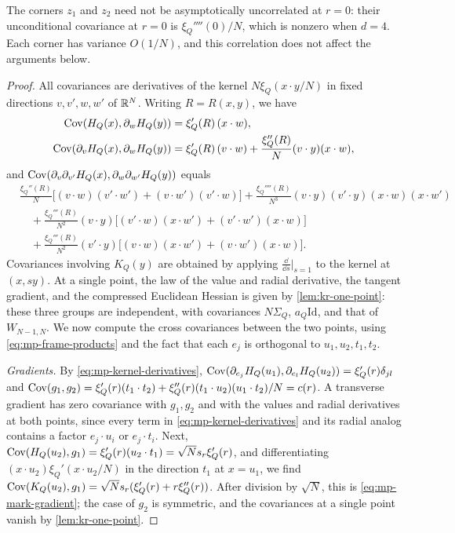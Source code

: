 The corners $z_1$ and $z_2$ need not be asymptotically uncorrelated at $r=0$: their unconditional covariance at $r=0$ is $\xi_Q''''(0)/N$, which is nonzero when $d=4$. Each corner has variance $O(1/N)$, and this correlation does not affect the arguments below.

\begin{proof}
All covariances are derivatives of the kernel $N\xi_Q(x\cdot y/N)$ in fixed directions $v,v',w,w'$ of $\mathbb R^N$. Writing $R=R(x,y)$, we have
\begin{equation}\label{eq:mp-kernel-derivatives}
\begin{aligned}
\operatorname{Cov}(H_Q(x),\partial_wH_Q(y))&=\xi_Q'(R)\,(x\cdot w),\\
\operatorname{Cov}(\partial_vH_Q(x),\partial_wH_Q(y))&=\xi_Q'(R)\,(v\cdot w)+\frac{\xi_Q''(R)}N(v\cdot y)(x\cdot w),
\end{aligned}
\end{equation}
and $\operatorname{Cov}(\partial_v\partial_{v'}H_Q(x),\partial_w\partial_{w'}H_Q(y))$ equals
\begin{equation}\label{eq:mp-fourth-derivative}
\begin{aligned}
&\frac{\xi_Q''(R)}N\bigl[(v\cdot w)(v'\cdot w')+(v\cdot w')(v'\cdot w)\bigr]+\frac{\xi_Q''''(R)}{N^3}(v\cdot y)(v'\cdot y)(x\cdot w)(x\cdot w')\\
&\quad+\frac{\xi_Q'''(R)}{N^2}(v\cdot y)\bigl[(v'\cdot w)(x\cdot w')+(v'\cdot w')(x\cdot w)\bigr]\\
&\quad+\frac{\xi_Q'''(R)}{N^2}(v'\cdot y)\bigl[(v\cdot w)(x\cdot w')+(v\cdot w')(x\cdot w)\bigr].
\end{aligned}
\end{equation}
Covariances involving $K_Q(y)$ are obtained by applying $\frac{\dd}{\dd s}|_{s=1}$ to the kernel at $(x,sy)$. At a single point, the law of the value and radial derivative, the tangent gradient, and the compressed Euclidean Hessian is given by \cref{lem:kr-one-point}: these three groups are independent, with covariances $N\Sigma_Q$, $a_Q\mathrm{Id}$, and that of $W_{N-1,N}$. We now compute the cross covariances between the two points, using \eqref{eq:mp-frame-products} and the fact that each $e_j$ is orthogonal to $u_1,u_2,t_1,t_2$.

\emph{Gradients.} By \eqref{eq:mp-kernel-derivatives}, $\operatorname{Cov}(\partial_{e_j}H_Q(u_1),\partial_{e_l}H_Q(u_2))=\xi_Q'(r)\delta_{jl}$ and $\operatorname{Cov}(g_1,g_2)=\xi_Q'(r)(t_1\cdot t_2)+\xi_Q''(r)(t_1\cdot u_2)(u_1\cdot t_2)/N=c(r)$. A transverse gradient has zero covariance with $g_1,g_2$ and with the values and radial derivatives at both points, since every term in \eqref{eq:mp-kernel-derivatives} and its radial analog contains a factor $e_j\cdot u_i$ or $e_j\cdot t_i$. Next, $\operatorname{Cov}(H_Q(u_2),g_1)=\xi_Q'(r)(u_2\cdot t_1)=\sqrt Ns_r\xi_Q'(r)$, and differentiating $(x\cdot u_2)\xi_Q'(x\cdot u_2/N)$ in the direction $t_1$ at $x=u_1$, we find $\operatorname{Cov}(K_Q(u_2),g_1)=\sqrt Ns_r(\xi_Q'(r)+r\xi_Q''(r))$. After division by $\sqrt N$, this is \eqref{eq:mp-mark-gradient}; the case of $g_2$ is symmetric, and the covariances at a single point vanish by \cref{lem:kr-one-point}.


\end{proof}
